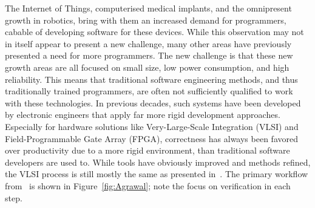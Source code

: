 The Internet of Things, computerised medical implants, and the omnipresent growth in robotics, bring with them an increased demand for programmers, cabable of developing software for these devices. While this observation may not in itself appear to present a new challenge, many other areas have previously presented a need for more programmers. The new challenge is that these new growth areas are all focused on small size, low power consumption, and high reliability. This means that traditional software engineering methods, and thus traditionally trained programmers, are often not sufficiently qualified to work with these technologies.
In previous decades, such systems have been developed by electronic engineers that apply far more rigid development approaches. Especially for hardware solutions like Very-Large-Scale Integration (VLSI) and Field-Programmable Gate Array (FPGA), correctness has always been favored over productivity due to a more rigid environment, than traditional software developers are used to.
While tools have obviously improved and methods refined, the VLSI process is still mostly the same as presented in~\cite{Agrawal:1985:VDP:320599.322570}. The primary workflow from~\cite{Agrawal:1985:VDP:320599.322570} is shown in Figure~\ref{fig:Agrawal}; note the focus on verification in each step.
